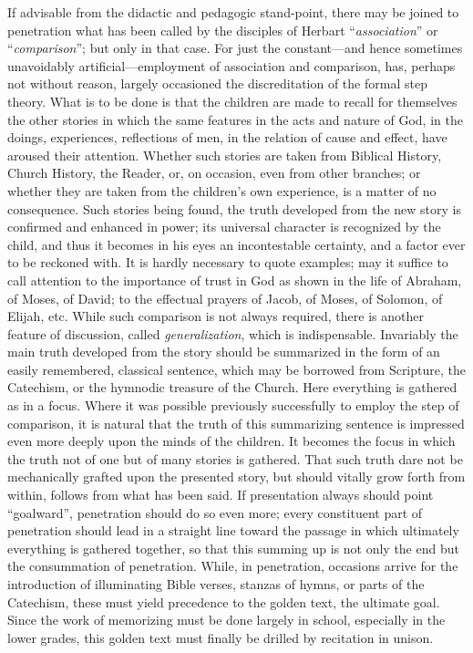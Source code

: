 If advisable from the didactic and pedagogic stand-point, there may be joined to penetration what has been called by the disciples of Herbart “\emph{association}” or “\emph{comparison}”; but only in that case. For just the constant—and hence sometimes unavoidably artificial—employment of association and comparison, has, perhaps not without reason, largely occasioned the discreditation of the formal step theory. What is to be done is that the children are made to recall
for themselves the other stories in which the same features in the acts and nature of God, in the doings, experiences, reflections of men, in the relation of cause and effect, have aroused their attention. Whether such stories are taken from Biblical History, Church History, the Reader, or, on occasion, even from other branches; or whether they are taken from the children's own experience, is a matter of no consequence. Such stories being found, the truth developed from the new story is confirmed and enhanced in power; its universal character is recognized by the child, and thus it becomes in his eyes an incontestable certainty, and a factor ever to be reckoned with. It is hardly necessary to quote examples; may it suffice to call attention to the importance of trust in God as shown in the life of Abraham, of Moses, of David; to the effectual prayers of Jacob, of Moses, of Solomon, of Elijah, etc. While such comparison is not always required, there is another feature of discussion, called \emph{generalization}, which is indispensable. Invariably the main truth developed from the story should be summarized in the form of an easily remembered, classical sentence, which may be borrowed from Scripture, the Catechism, or the hymnodic treasure of the Church. Here everything is gathered as in a focus. Where it was possible previously successfully to employ the step of comparison, it is natural that the truth of this summarizing sentence is impressed even more deeply upon the minds of the children. It becomes the focus in which the truth not of one but of many stories is gathered. That such truth dare not be mechanically grafted upon the presented story, but should vitally grow forth from within, follows from what has been said. If presentation always should point “goalward”, penetration should do so even more; every constituent part of penetration should lead in a straight line toward the passage in which ultimately everything is gathered together, so that this summing up is not
only the end but the consummation of penetration. While, in penetration, occasions arrive for the introduction of illuminating Bible verses, stanzas of hymns, or parts of the Catechism, these must yield precedence to the golden text, the ultimate goal. Since the work of memorizing must be done largely in school, especially in the lower grades, this golden text must finally be drilled by recitation in unison.

